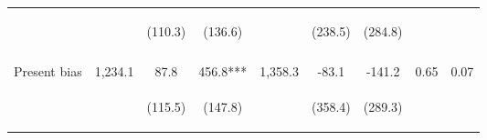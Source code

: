\begin{tabular}{lcccccccc}
 & \begin{footnotesize}\end{footnotesize} & \begin{footnotesize}(110.3)\end{footnotesize} & \begin{footnotesize}(136.6)\end{footnotesize} & \begin{footnotesize}\end{footnotesize} & \begin{footnotesize}(238.5)\end{footnotesize} & \begin{footnotesize}(284.8)\end{footnotesize} & \begin{footnotesize}\end{footnotesize} & \begin{footnotesize}\end{footnotesize}\\
 & \begin{footnotesize}\end{footnotesize} & \begin{footnotesize}[1.000]\end{footnotesize} & \begin{footnotesize}[0.036]\end{footnotesize} & \begin{footnotesize}\end{footnotesize} & \begin{footnotesize}[1.000]\end{footnotesize} & \begin{footnotesize}[0.527]\end{footnotesize} & \begin{footnotesize}\end{footnotesize} & \begin{footnotesize}\end{footnotesize}\\
\noalign{\smallskip}Present bias & 1,234.1 & 87.8 & 456.8*** & 1,358.3 & -83.1 & -141.2 & 0.65 & 0.07\\
 & \begin{footnotesize}\end{footnotesize} & \begin{footnotesize}(115.5)\end{footnotesize} & \begin{footnotesize}(147.8)\end{footnotesize} & \begin{footnotesize}\end{footnotesize} & \begin{footnotesize}(358.4)\end{footnotesize} & \begin{footnotesize}(289.3)\end{footnotesize} & \begin{footnotesize}\end{footnotesize} & \begin{footnotesize}\end{footnotesize}\\

\end{tabular}
